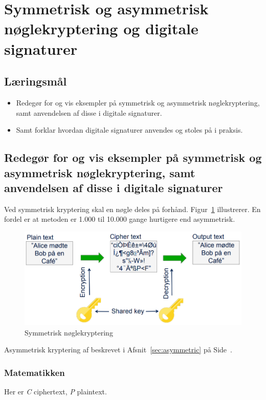 \section{Symmetrisk og asymmetrisk nøglekryptering og digitale signaturer}

\subsection{Læringsmål}

\begin{itemize}
	\item Redegør for og vis eksempler på symmetrisk og asymmetrisk nøglekryptering, samt
	anvendelsen af disse i digitale signaturer.
	\item Samt forklar hvordan digitale signaturer anvendes og stoles på i praksis.
\end{itemize}

\subsection{Redegør for og vis eksempler på symmetrisk og asymmetrisk nøglekryptering, samt anvendelsen af disse i digitale signaturer}
Ved symmetrisk kryptering skal en nøgle deles på forhånd. Figur~\ref{fig:symmetrickeyenc} illustrerer. En fordel er at metoden er 1.000 til 10.000 gange hurtigere end asymmetrisk. 

\begin{figure}[H]
	\centering
	\includegraphics[width=0.8\linewidth]{figs/spm5/symmetric_key_enc}
	\caption{Symmetrisk nøglekryptering}
	\label{fig:symmetrickeyenc}
\end{figure}

Asymmetrisk kryptering af beskrevet i Afsnit~\ref{sec:asymmetric} på Side~\pageref{sec:asymmetric}.

\subsubsection{Matematikken}
Her er \textit{C} ciphertext, \textit{P} plaintext.

